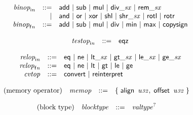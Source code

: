 $$
\begin{array}{@{}lrrl@{}l@{}}
& {{\mathit{binop}}}_{{\mathsf{i}}{{\mathit{n}}}} &::=& \mathsf{add} ~|~ \mathsf{sub} ~|~ \mathsf{mul} ~|~ {\mathsf{div\_}}{{\mathit{sx}}} ~|~ {\mathsf{rem\_}}{{\mathit{sx}}} \\ &&|&
\mathsf{and} ~|~ \mathsf{or} ~|~ \mathsf{xor} ~|~ \mathsf{shl} ~|~ {\mathsf{shr\_}}{{\mathit{sx}}} ~|~ \mathsf{rotl} ~|~ \mathsf{rotr} \\
& {{\mathit{binop}}}_{{\mathsf{f}}{{\mathit{n}}}} &::=& \mathsf{add} ~|~ \mathsf{sub} ~|~ \mathsf{mul} ~|~ \mathsf{div} ~|~ \mathsf{min} ~|~ \mathsf{max} ~|~ \mathsf{copysign} \\
\end{array}
$$

$$
\begin{array}{@{}lrrl@{}l@{}}
& {{\mathit{testop}}}_{{\mathsf{i}}{{\mathit{n}}}} &::=& \mathsf{eqz} \\
\end{array}
$$

$$
\begin{array}{@{}lrrl@{}l@{}}
& {{\mathit{relop}}}_{{\mathsf{i}}{{\mathit{n}}}} &::=& \mathsf{eq} ~|~ \mathsf{ne} ~|~ {\mathsf{lt\_}}{{\mathit{sx}}} ~|~ {\mathsf{gt\_}}{{\mathit{sx}}} ~|~ {\mathsf{le\_}}{{\mathit{sx}}} ~|~ {\mathsf{ge\_}}{{\mathit{sx}}} \\
& {{\mathit{relop}}}_{{\mathsf{f}}{{\mathit{n}}}} &::=& \mathsf{eq} ~|~ \mathsf{ne} ~|~ \mathsf{lt} ~|~ \mathsf{gt} ~|~ \mathsf{le} ~|~ \mathsf{ge} \\
& {\mathit{cvtop}} &::=& \mathsf{convert} ~|~ \mathsf{reinterpret} \\
\end{array}
$$

\vspace{1ex}

$$
\begin{array}{@{}lrrl@{}l@{}}
\mbox{(memory operator)} & {\mathit{memop}} &::=& \{\; \begin{array}[t]{@{}l@{}l@{}}
\mathsf{align}~\,{\mathit{u{\scriptstyle32}}},\; \mathsf{offset}~\,{\mathit{u{\scriptstyle32}}} \;\}\end{array} \\
\end{array}
$$

\vspace{1ex}

$$
\begin{array}{@{}lrrl@{}l@{}}
\mbox{(block type)} & {\mathit{blocktype}} &::=& {{\mathit{valtype}}^?} \\
\end{array}
$$

